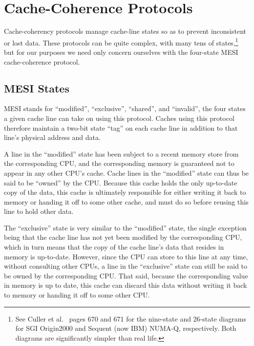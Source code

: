 \section{Cache-Coherence Protocols}
\label{sec:app:whymb:Cache-Coherence Protocols}

Cache-coherency protocols manage cache-line states so as to prevent
inconsistent or lost data.
These protocols can be quite complex, with many tens
of states,\footnote{
	See Culler et al.~\cite{DavidECuller1999} pages 670 and 671
	for the nine-state and 26-state diagrams for SGI Origin2000
	and Sequent (now IBM) NUMA-Q, respectively.
	Both diagrams are significantly simpler than real life.}
but for our purposes we need only concern ourselves with the
four-state MESI cache-coherence protocol.

\subsection{MESI States}
\label{sec:app:whymb:MESI States}

MESI stands for ``modified'', ``exclusive'', ``shared'', and ``invalid'',
the four states a given cache line can take on using this
protocol.
Caches using this protocol therefore maintain a two-bit state ``tag'' on each
cache line in addition to that line's physical address and data.

A line in the ``modified'' state has been subject to a recent memory store
from the corresponding CPU, and the corresponding memory is guaranteed
not to appear in any other CPU's cache.
Cache lines in the ``modified'' state can thus be said to be ``owned''
by the CPU.
Because this cache holds the only up-to-date copy of the data, this
cache is ultimately responsible for either writing it back to memory
or handing it off to some other cache, and must do so before reusing
this line to hold other data.

The ``exclusive'' state is very similar to the ``modified'' state,
the single exception being that the cache line has not yet been
modified by the corresponding CPU, which in turn means that the
copy of the cache line's data that resides in memory is up-to-date.
However, since the CPU can store to this line at any time, without
consulting other CPUs, a line in the ``exclusive'' state can still
be said to be owned by the corresponding CPU.
That said, because the corresponding value in memory is up to date,
this cache can discard this data without writing it back to memory
or handing it off to some other CPU.


